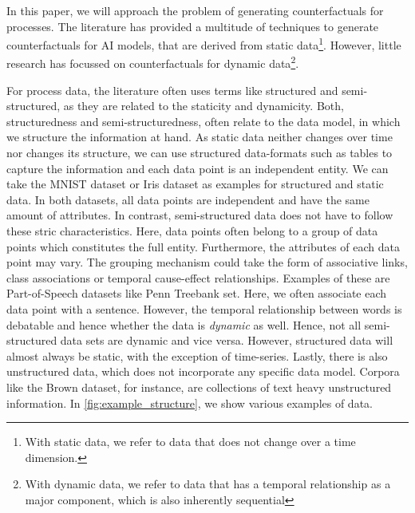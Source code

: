 \documentclass[./../../paper.tex]{subfiles}
\begin{document}
In this paper, we will approach the problem of generating counterfactuals for processes. The literature has provided a multitude of techniques to generate counterfactuals for AI models, that are derived from static data\footnote{With static data, we refer to data that does not change over a time dimension.}. However, little research has focussed on counterfactuals for dynamic data\footnote{With dynamic data, we refer to data that has a temporal relationship as a major component, which is also inherently sequential}.  

For process data, the literature often uses terms like structured and semi-structured, as they are related to the staticity and dynamicity. Both, structuredness and semi-structuredness, often relate to the data model, in which we structure the information at hand. As static data neither changes over time nor changes its structure, we can use structured data-formats such as tables to capture the information and each data point is an independent entity. We can take the MNIST dataset\autocite{deng_MNISTDatabaseHandwritten_2012} or Iris dataset\autocites{anderson_SpeciesProblemIris_1936,fisher_UseMultipleMeasurements_1936} as examples for structured and static data. In both datasets, all data points are independent and have the same amount of attributes. In contrast, semi-structured data does not have to follow these stric characteristics. Here, data points often belong to a group of data points which constitutes the full entity. Furthermore, the attributes of each data point may vary. The grouping mechanism could take the form of associative links, class associations or temporal cause-effect relationships. Examples of these are Part-of-Speech datasets like Penn Treebank set\autocite{marcus_Buildinglargeannotated_1993}. Here, we often associate each data point with a sentence. However, the temporal relationship between words is debatable and hence whether the data is \emph{dynamic} as well. Hence, not all semi-structured data sets are dynamic and vice versa. However, structured data will almost always be static, with the exception of time-series. Lastly, there is also unstructured data, which does not incorporate any specific data model. Corpora like the Brown dataset\autocite{francis79browncorpus}, for instance, are collections of text heavy unstructured information. In \autoref{fig:example_structure}, we show various examples of data.

\end{document}
